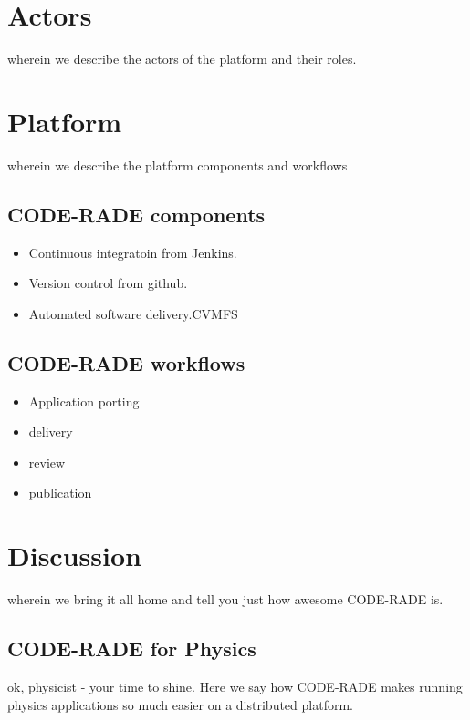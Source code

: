 \documentclass[a4paper]{jpconf}
\begin{document}
\section{Actors}

wherein we describe the actors of the platform and their roles.

\section{Platform}

wherein we describe the platform components and workflows

\subsection{CODE-RADE components}

\begin{itemize}
	\item Continuous integratoin from Jenkins.
    \item Version control from github.
    \item Automated software delivery.CVMFS
\end{itemize}

\subsection{CODE-RADE workflows}

\begin{itemize}
	\item Application porting
   \item delivery
   \item review
   \item publication
\end{itemize}

\section{Discussion}

wherein we bring it all home and tell you just how awesome CODE-RADE is.

\subsection{CODE-RADE for Physics}

ok, physicist - your time to shine. Here we say how CODE-RADE makes running physics applications so much easier on a distributed platform.
\end{document}
